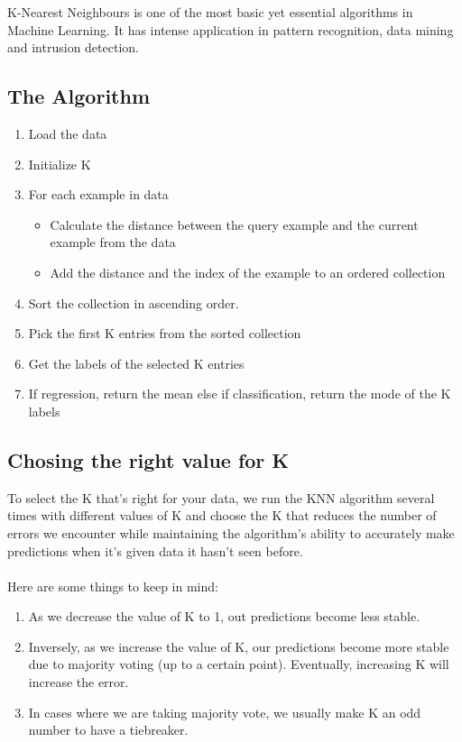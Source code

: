 K-Nearest Neighbours is one of the most basic yet essential algorithms in Machine Learning. It has intense application in pattern recognition, data mining and intrusion detection.

\subsection*{The Algorithm}
	\begin{enumerate}
		\item Load the data
		\item Initialize K
		\item For each example in data
		\begin{itemize}
			\item Calculate the distance between the query example and the current example from the data
			\item Add the distance and the index of the example to an ordered collection
		\end{itemize}
		\item Sort the collection in ascending order.
		\item Pick the first K entries from the sorted collection
		\item Get the labels of the selected K entries
		\item If regression, return the mean else if classification, return the mode of the K labels
	\end{enumerate}

\subsection*{Chosing the right value for K}
	To select the K that’s right for your data, we run the KNN algorithm several times with different values of K and choose the K that reduces the number of errors we encounter while maintaining the algorithm’s ability to accurately make predictions when it’s given data it hasn’t seen before.\\ \\
	Here are some things to keep in mind:
	\begin{enumerate}
		\item As we decrease the value of K to 1, out predictions become less stable.
		\item Inversely, as we increase the value of K, our predictions become more stable due to majority voting (up to a certain point). Eventually, increasing K will increase the error.
		\item In cases where we are taking majority vote, we usually make K an odd number to have a tiebreaker. 
	\end{enumerate}

